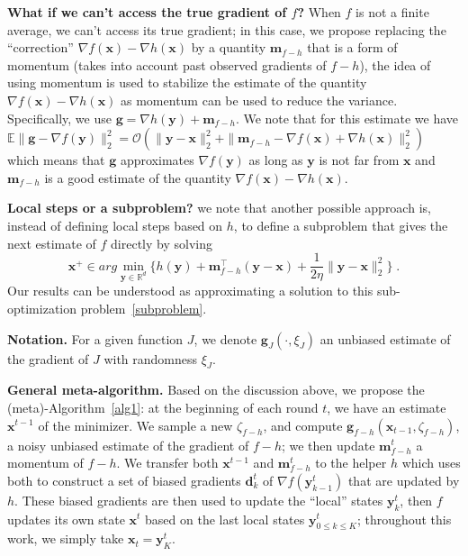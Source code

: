 \documentclass[10pt]{article} %
\theoremstyle{plain}
\theoremstyle{definition}
\theoremstyle{remark}
\newcommand{\norm}[1]{\|#1\|_2}
\def\vd{{\bm{d}}}
\def\vg{{\bm{g}}}
\def\vm{{\bm{m}}}
\def\vx{{\bm{x}}}
\def\vy{{\bm{y}}}
\newcommand{\E}{\mathbb{E}}
\newcommand{\R}{\mathbb{R}}
\begin{document}
\textbf{What if we can't access the true gradient of $f$?}
When $f$ is not a finite average, we can't access its true gradient; in this case, we propose replacing the ``correction'' $\nabla f(\vx) - \nabla h(\vx)$ by a quantity $\vm_{f-h}$ that is a form of momentum (takes into account past observed gradients of $f-h$), the idea of using momentum is used to stabilize the estimate of the quantity $\nabla f(\vx) - \nabla h(\vx)$ as momentum can be used to reduce the variance. Specifically, we use $\vg = \nabla h(\vy) + \vm_{f-h}$. We note that for this estimate we have $\E\norm{\vg -\nabla f(\vy) }^2=\mathcal{O}(\norm{\vy-\vx}^2 + \norm{\vm_{f-h} - \nabla f(\vx) + \nabla h(\vx)}^2)$ which means that $\vg$ approximates $\nabla f(\vy)$ as long as $\vy$ is not far from $\vx$ and $\vm_{f-h}$ is a good estimate of the quantity $\nabla f(\vx) - \nabla h(\vx)$.

\textbf{Local steps or a subproblem?} we note that another possible approach is, instead of defining local steps based on $h$, to define a subproblem that gives the next estimate of $f$ directly by solving \begin{equation}
    \label{subproblem}
    \vx^+ \in arg\min_{\vy \in\R^d}\{h(\vy) +  \vm_{f-h}^\top(\vy - \vx) + \frac{1}{2\eta}\norm{\vy - \vx}^2\}\;.
\end{equation}
Our results can be understood as approximating a solution to this sub-optimization problem~\eqref{subproblem}.

\textbf{Notation.} For a given function $J$, we denote $\vg_J(\cdot,\xi_J)$ an unbiased estimate of the gradient of $J$ with randomness $\xi_J$.

\textbf{General meta-algorithm.} Based on the discussion above, we propose the (meta)-Algorithm~\ref{alg1}: at the beginning of each round $t$, we have an estimate $\vx^{t-1}$ of the minimizer.  We sample a new $\zeta_{f-h}$, and compute $\vg_{f-h}(\vx_{t-1},\zeta_{f-h})$, a noisy unbiased estimate of the gradient of $f-h$; we then update $\vm_{f-h}^t$ a momentum of $f-h$. We transfer both $\vx^{t-1}$ and $\vm_{f-h}^t$ to the helper $h$ which uses both to construct a set of biased gradients $\vd^t_k$ of $\nabla f(\vy^t_{k-1})$ that are updated by $h$. These biased gradients are then used to update the ``local'' states  $\vy^t_{k}$, then $f$ updates its own state $\vx^t$ based on the last local states $\vy^t_{0\leq k\leq K}$; throughout this work, we simply take $\vx_t = \vy^t_K$.
\end{document}
